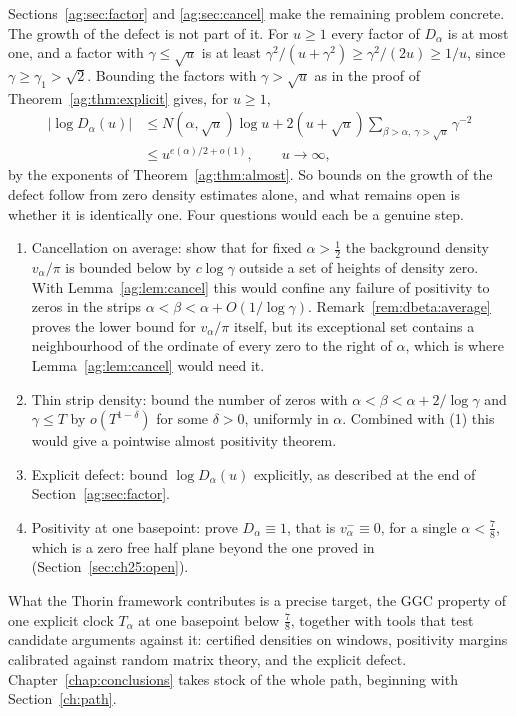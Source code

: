 Sections~\ref{ag:sec:factor} and \ref{ag:sec:cancel} make the remaining problem concrete. The growth of the defect is not part of it. For $u\ge1$ every factor of $D_\alpha$ is at most one, and a factor with $\gamma\le\sqrt u$ is at least $\gamma^2/(u+\gamma^2)\ge\gamma^2/(2u)\ge1/u$, since $\gamma\ge\gamma_1>\sqrt2$. Bounding the factors with $\gamma>\sqrt u$ as in the proof of Theorem~\ref{ag:thm:explicit} gives, for $u\ge1$,
\begin{align*}
|\log D_\alpha(u)|&\le N(\alpha,\sqrt u)\log u+2(u+\sqrt u)\sum_{\beta>\alpha,\ \gamma>\sqrt u}\gamma^{-2}\\
&\le u^{e(\alpha)/2+o(1)},\qquad u\to\infty,
\end{align*}
by the exponents of Theorem~\ref{ag:thm:almost}. So bounds on the growth of the defect follow from zero density estimates alone, and what remains open is whether it is identically one. Four questions would each be a genuine step.
\begin{enumerate}
\item Cancellation on average: show that for fixed $\alpha>\frac12$ the background density $v_\alpha/\pi$ is bounded below by $c\log\gamma$ outside a set of heights of density zero. With Lemma~\ref{ag:lem:cancel} this would confine any failure of positivity to zeros in the strips $\alpha<\beta<\alpha+O(1/\log\gamma)$. Remark~\ref{rem:dbeta:average} proves the lower bound for $v_\alpha/\pi$ itself, but its exceptional set contains a neighbourhood of the ordinate of every zero to the right of $\alpha$, which is where Lemma~\ref{ag:lem:cancel} would need it.
\item Thin strip density: bound the number of zeros with $\alpha<\beta<\alpha+2/\log\gamma$ and $\gamma\le T$ by $o(T^{1-\delta})$ for some $\delta>0$, uniformly in $\alpha$. Combined with (1) this would give a pointwise almost positivity theorem.
\item Explicit defect: bound $\log D_\alpha(u)$ explicitly, as described at the end of Section~\ref{ag:sec:factor}.
\item Positivity at one basepoint: prove $D_\alpha\equiv1$, that is $v_\alpha^-\equiv0$, for a single $\alpha<\frac78$, which is a zero free half plane beyond the one proved in \cite{OAI26a} (Section~\ref{sec:ch25:open}).
\end{enumerate}
What the Thorin framework contributes is a precise target, the GGC property of one explicit clock $T_\alpha$ at one basepoint below $\frac78$, together with tools that test candidate arguments against it: certified densities on windows, positivity margins calibrated against random matrix theory, and the explicit defect. Chapter~\ref{chap:conclusions} takes stock of the whole path, beginning with Section~\ref{ch:path}.
